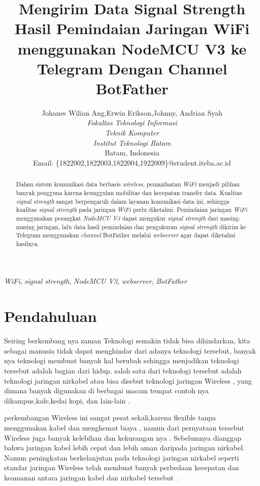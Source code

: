 \documentclass[conference]{IEEEtran}
\title{Mengirim Data Signal Strength Hasil Pemindaian Jaringan WiFi menggunakan NodeMCU V3 ke Telegram Dengan Channel BotFather}
\author{Johanes Wilian Ang\IEEEauthorrefmark{1},Erwin Erikson\IEEEauthorrefmark{2},Johnny\IEEEauthorrefmark{3}, Andrian Syah\IEEEauthorrefmark{4}\\
\textit{Fakultas Teknologi Informasi}\\
\textit{Teknik Komputer}\\
\textit{Institut Teknologi Batam}\\
Batam, Indonesia\\
Email: \{\IEEEauthorrefmark{1}1822002,\IEEEauthorrefmark{2}1822003,\IEEEauthorrefmark{3}1822004,\IEEEauthorrefmark{4}1922009\}@student.iteba.ac.id}
\begin{document}
\maketitle

\begin{abstract}
    Dalam sistem komunikasi data berbasis \emph{wireless}, pemanfaatan \emph{WiFi} 
    menjadi pilihan banyak pengguna karena keunggulan mobilitas dan kecepatan transfer data.
    Kualitas \emph{signal strength} sangat berpengaruh dalam layanan komunikasi data ini, 
    sehingga kualitas \emph{signal strength} pada jaringan \emph{WiFi} perlu diketahui.
    Pemindaian jaringan \emph{WiFi} menggunakan perangkat \emph{NodeMCU V3} dapat mengukur \emph{signal strength} dari 
    masing-masing jaringan, lalu data hasil pemindaian dan pengukuran \emph{signal strength} dikirim ke
    Telegram menggunakan \emph{channel} BotFather melalui \emph{webserver} agar dapat diketahui hasilnya.
\end{abstract}

\begin{IEEEkeywords}
    \emph{WiFi}, \emph{signal strength}, \emph{NodeMCU V3}, \emph{webserver}, \emph{BotFather}
\end{IEEEkeywords}

\section{Pendahuluan}
Seiring berkembang nya zaman Teknologi semakin tidak bisa dihindarkan, 
kita sebagai manusia tidak dapat menghindar dari adanya teknologi tersebut,
banyak nya teknologi membuat banyak hal berubah sehingga menjadikan teknologi tersebut 
adalah bagian dari hidup. salah satu dari teknologi tersebut adalah teknologi jaringan nirkabel
atau bisa disebut teknologi jaringan Wireless , yang dimana banyak digunakan di berbagai macam tempat 
contoh nya dikampus,kafe,kedai kopi, dan lain-lain .

perkembangan Wireless ini sangat pesat sekali,karena flexible tanpa menggunakan kabel dan menghemat biaya 
, namun dari pernyataan tersebut Wireless juga banyak kelebihan dan kekurangan nya . 
Sebelumnya dianggap bahwa jaringan kabel lebih cepat dan lebih aman daripada jaringan nirkabel.
Namun peningkatan berkelanjutan pada teknologi jaringan nirkabel seperti standar jaringan Wireless
 telah membuat banyak perbedaan kecepatan dan keamanan antara jaringan kabel dan nirkabel tersebut~.
\end{document}
